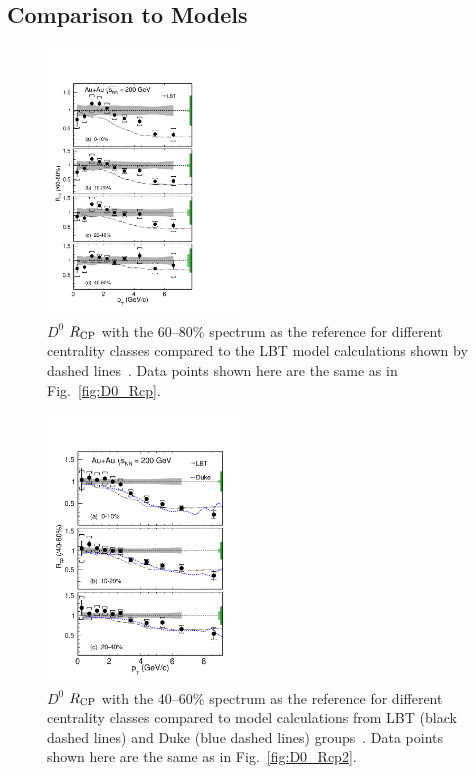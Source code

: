\documentclass[%
 reprint,	
 amsmath,amssymb,
 aps,
 prc,
]{revtex4-1}
\begin{document}
\subsection{Comparison to Models}
\label{result:theory}

\begin{figure}
\centering
\includegraphics[width=0.45\textwidth]{fig/D0_Rcp11.pdf}
\caption{$D^{0}$ $R_{\rm CP}$ with the 60--80\% spectrum as the reference for different centrality classes compared to the LBT model calculations shown by dashed lines~\cite{Cao:2016gvr,LBT:private}. Data points shown here are the same as in Fig.~\ref{fig:D0_Rcp}.}
\label{fig:D0_Rcp11} 
\end{figure}

\begin{figure}
\centering
\includegraphics[width=0.45\textwidth]{fig/D0_Rcp22.pdf}
  \caption{$D^{0}$ $R_{\rm CP}$ with the 40--60\% spectrum as the reference for different centrality classes compared to model calculations from LBT (black dashed lines) and Duke (blue dashed lines) groups~\cite{Cao:2016gvr,LBT:private,Xu:2017obm}. Data points shown here are the same as in Fig.~\ref{fig:D0_Rcp2}.}
\label{fig:D0_Rcp22} 
\end{figure}
\end{document}
